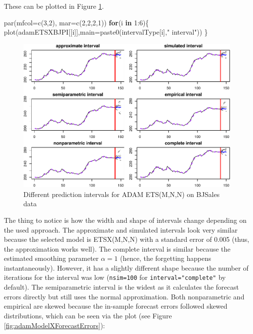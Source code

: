 \documentclass[
]{book}
\newenvironment{Shaded}{\begin{snugshade}}{\end{snugshade}}
\newcommand{\AttributeTok}[1]{\textcolor[rgb]{0.77,0.63,0.00}{#1}}
\newcommand{\ControlFlowTok}[1]{\textcolor[rgb]{0.13,0.29,0.53}{\textbf{#1}}}
\newcommand{\DecValTok}[1]{\textcolor[rgb]{0.00,0.00,0.81}{#1}}
\newcommand{\FunctionTok}[1]{\textcolor[rgb]{0.00,0.00,0.00}{#1}}
\newcommand{\NormalTok}[1]{#1}
\newcommand{\SpecialCharTok}[1]{\textcolor[rgb]{0.00,0.00,0.00}{#1}}
\newcommand{\StringTok}[1]{\textcolor[rgb]{0.31,0.60,0.02}{#1}}
\theoremstyle{definition}
\theoremstyle{definition}
\theoremstyle{definition}
\theoremstyle{definition}
\theoremstyle{remark}
\begin{document}
These can be plotted in Figure \ref{fig:adamModelXPI6Plots}.

\begin{Shaded}
\begin{Highlighting}[]
\FunctionTok{par}\NormalTok{(}\AttributeTok{mfcol=}\FunctionTok{c}\NormalTok{(}\DecValTok{3}\NormalTok{,}\DecValTok{2}\NormalTok{), }\AttributeTok{mar=}\FunctionTok{c}\NormalTok{(}\DecValTok{2}\NormalTok{,}\DecValTok{2}\NormalTok{,}\DecValTok{2}\NormalTok{,}\DecValTok{1}\NormalTok{))}
\ControlFlowTok{for}\NormalTok{(i }\ControlFlowTok{in} \DecValTok{1}\SpecialCharTok{:}\DecValTok{6}\NormalTok{)\{}
  \FunctionTok{plot}\NormalTok{(adamETSXBJPI[[i]],}\AttributeTok{main=}\FunctionTok{paste0}\NormalTok{(intervalType[i],}\StringTok{" interval"}\NormalTok{))}
\NormalTok{\}}
\end{Highlighting}
\end{Shaded}

\begin{figure}
\centering
\includegraphics{Svetunkov--2022----ADAM_files/figure-latex/adamModelXPI6Plots-1.pdf}
\caption{\label{fig:adamModelXPI6Plots}Different prediction intervals for ADAM ETS(M,N,N) on BJSales data}
\end{figure}

The thing to notice is how the width and shape of intervals change depending on the used approach. The approximate and simulated intervals look very similar because the selected model is ETSX(M,N,N) with a standard error of 0.005 (thus, the approximation works well). The complete interval is similar because the estimated smoothing parameter \(\alpha=1\) (hence, the forgetting happens instantaneously). However, it has a slightly different shape because the number of iterations for the interval was low (\texttt{nsim=100} for \texttt{interval="complete"} by default). The semiparametric interval is the widest as it calculates the forecast errors directly but still uses the normal approximation. Both nonparametric and empirical are skewed because the in-sample forecast errors followed skewed distributions, which can be seen via the plot (see Figure \ref{fig:adamModelXForecastErrors}):
\end{document}
